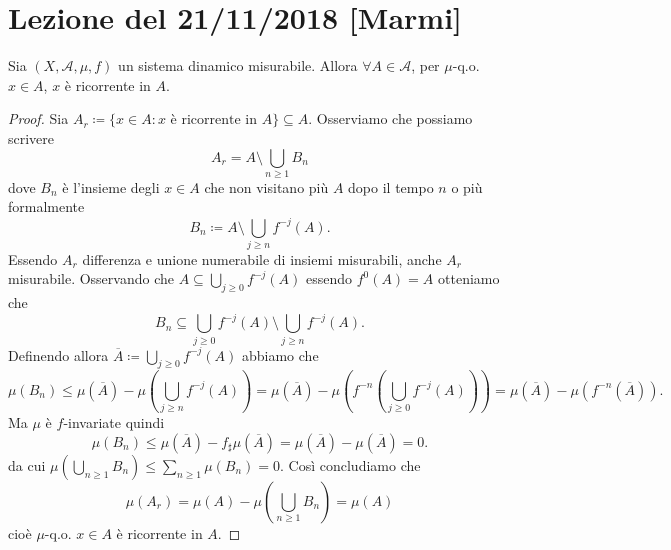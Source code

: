 \section{Lezione del 21/11/2018 [Marmi]}

\begin{thm}
    Sia $ (X, \mathcal{A}, \mu, f) $ un sistema dinamico misurabile. Allora $ \forall A \in \mathcal{A} $, per $ \mu $-q.o. $ x \in A $, $ x $ è ricorrente in $ A $.
\end{thm}
\begin{proof}
    Sia $ A_r \coloneqq \{x \in A : x \text{ è ricorrente in } A\} \subseteq A $. Osserviamo che possiamo scrivere
    \[
        A_r = A \setminus \bigcup_{n \geq 1} B_n
    \]
    dove $ B_n $ è l'insieme degli $ x \in A $ che non visitano più $ A $ dopo il tempo $ n $ o più formalmente
    \[
        B_n \coloneqq A \setminus \bigcup_{j \geq n} f^{-j}(A).
    \]
    Essendo $ A_r $ differenza e unione numerabile di insiemi misurabili, anche $ A_r $ misurabile. Osservando che $ A \subseteq \bigcup_{j \geq 0} f^{-j}(A) $ essendo $ f^{0}(A) = A $ otteniamo che
    \[
        B_n \subseteq \bigcup_{j \geq 0} f^{-j}(A) \setminus  \bigcup_{j \geq n} f^{-j}(A).
    \]
    Definendo allora $ \overline{A} \coloneqq \bigcup_{j \geq 0} f^{-j}(A) $ abbiamo che
    \[
        \mu(B_n) \leq \mu(\overline{A}) - \mu\left(\textstyle{\bigcup_{j \geq n}} f^{-j}(A)\right) = \mu(\overline{A}) - \mu\left(f^{-n}\left(\textstyle{\bigcup_{j \geq 0}} f^{-j}(A)\right)\right) = \mu(\overline{A}) - \mu(f^{-n}(\overline{A})).
    \]
    Ma $ \mu $ è $ f $-invariate quindi
    \[
        \mu(B_n) \leq \mu(\overline{A}) - f_{\sharp}\mu(\overline{A}) = \mu(\overline{A}) - \mu(\overline{A}) = 0.
    \]
    da cui $ \mu\left(\bigcup_{n \geq 1} B_n\right) \leq \sum_{n \geq 1} \mu(B_n) = 0 $. Così concludiamo che
    \[
        \mu(A_r) = \mu(A) - \mu\left(\textstyle{\bigcup_{n \geq 1}} B_n\right) = \mu(A)
     \]
    cioè $ \mu $-q.o. $ x \in A $ è ricorrente in $ A $.
\end{proof}


